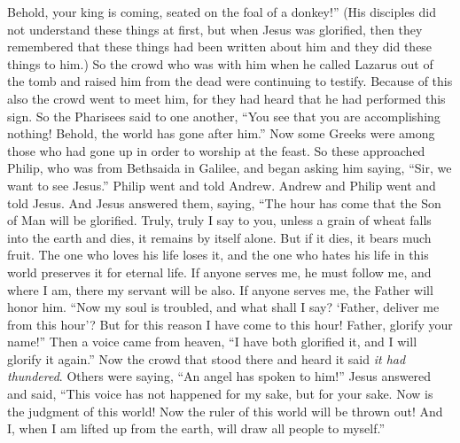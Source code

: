 \begin{biblechapter}
Behold, your king is coming, 
seated on the foal of a donkey!”
\verse (His disciples did not understand these things at first, but when Jesus was glorified, then they remembered that these things had been written about him and they did these things to him.)
\verse So the crowd who was with him when he called Lazarus out of the tomb and raised him from the dead were continuing to testify.
\verse Because of this also the crowd went to meet him, for they had heard that he had performed this sign.
\verse So the Pharisees said to one another, “You see that you are accomplishing nothing! Behold, the world has gone after him.”
 Now some Greeks were among those who had gone up in order to worship at the feast.
\verse So these approached Philip, who was from Bethsaida in Galilee, and began asking him saying, “Sir, we want to see Jesus.”
\verse Philip went and told Andrew. Andrew and Philip went and told Jesus.
\verse And Jesus answered them, saying, “The hour has come that the Son of Man will be glorified.
\verse Truly, truly I say to you, unless a grain of wheat falls into the earth and dies, it remains by itself alone. But if it dies, it bears much fruit.
\verse The one who loves his life loses it, and the one who hates his life in this world preserves it for eternal life.
\verse If anyone serves me, he must follow me, and where I am, there my servant will be also. If anyone serves me, the Father will honor him.
 “Now my soul is troubled, and what shall I say? ‘Father, deliver me from this hour’? But for this reason I have come to this hour!
\verse Father, glorify your name!” Then a voice came from heaven, “I have both glorified it, and I will glorify it again.”
\verse Now the crowd that stood there and heard it said \textit{it had thundered}. Others were saying, “An angel has spoken to him!”
\verse Jesus answered and said, “This voice has not happened for my sake, but for your sake.
\verse Now is the judgment of this world! Now the ruler of this world will be thrown out!
\verse And I, when I am lifted up from the earth, will draw all people to myself.”

\end{biblechapter}
